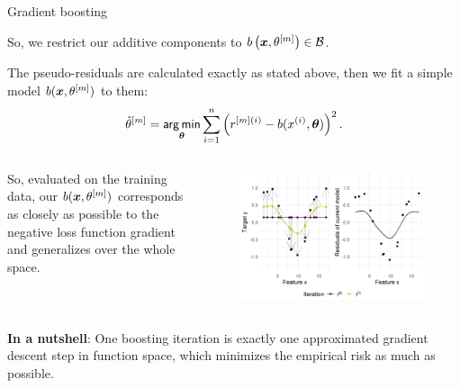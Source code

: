 \begin{vbframe}{Gradient boosting}
\begin{footnotesize}
\vspace*{0.3cm}


So, we restrict our additive components to $b\left(\bm{x}, \theta^{[m]}\right) \in \mathcal{B}$.


The pseudo-residuals are calculated exactly as stated above,
then we fit a simple model $b(\bm{x}, \theta^{[m]})$ to them:
$$ \hat{\theta}^{[m]} = \mathop{\sf arg\,min}_{\bm{\theta}} \sum_{i=1}^n \left(r^{[m](i)} - b(x^{(i)}, \bm{\theta})\right)^2. $$

\lz

\begin{columns}
\column{5cm}
So, evaluated on the training data,
our $b(\bm{x}, \theta^{[m]})$ corresponds as closely as possible to the negative
loss function gradient and generalizes over the whole space.


\column{5cm}
\vspace*{-1cm}
\begin{figure}[th]
  \includegraphics[width=\textwidth]{figure/fig-gb-concept-idea.png}
\end{figure}


\end{columns}
\end{footnotesize}

\framebreak
\begin{footnotesize}
\textbf{In a nutshell}: One boosting iteration is exactly one approximated gradient descent step in function space,
which minimizes the empirical risk as much as possible.



\end{footnotesize}
\end{vbframe}
